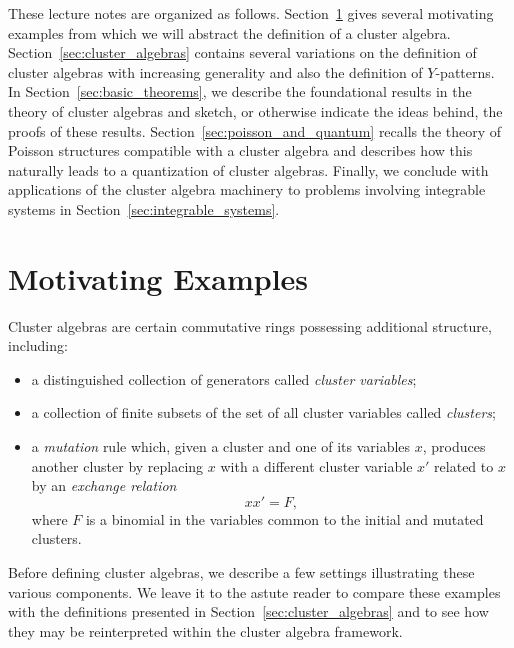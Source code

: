 \documentclass{amsart}
\theoremstyle{definition}
\theoremstyle{remark}
\numberwithin{equation}{section}
\begin{document}
  These lecture notes are organized as follows.  Section~\ref{sec:motivation} gives several motivating examples from which we will abstract the definition of a cluster algebra.  %
	Section~\ref{sec:cluster_algebras} contains several variations on the definition of cluster algebras with increasing generality and also the definition of $Y$-patterns.  In Section~\ref{sec:basic_theorems}, we describe the foundational results in the theory of cluster algebras and sketch, or otherwise indicate the ideas behind, the proofs of these results. Section~\ref{sec:poisson_and_quantum} recalls the theory of Poisson structures compatible with a cluster algebra and describes how this naturally leads to a quantization of cluster algebras.  Finally, we conclude with applications of the cluster algebra machinery to problems involving integrable systems in Section~\ref{sec:integrable_systems}.


\section{Motivating Examples}\label{sec:motivation}
	Cluster algebras are certain commutative rings possessing additional structure, including:
	\begin{itemize}
		\item a distinguished collection of generators called \emph{cluster variables};
		\item a collection of finite subsets of the set of all cluster variables called \emph{clusters};
		\item a \emph{mutation} rule which, given a cluster and one of its variables $x$, produces another cluster by replacing $x$ with a different cluster variable $x'$ related to $x$ by an \emph{exchange relation}
		\begin{displaymath}
			xx' = F,
		\end{displaymath}
		where $F$ is a binomial in the variables common to the initial and mutated clusters.
	\end{itemize}
	Before defining cluster algebras, we describe a few settings illustrating these various components.  We leave it to the astute reader to compare these examples with the definitions presented in Section~\ref{sec:cluster_algebras} and to see how they may be reinterpreted within the cluster algebra framework.
\end{document}

